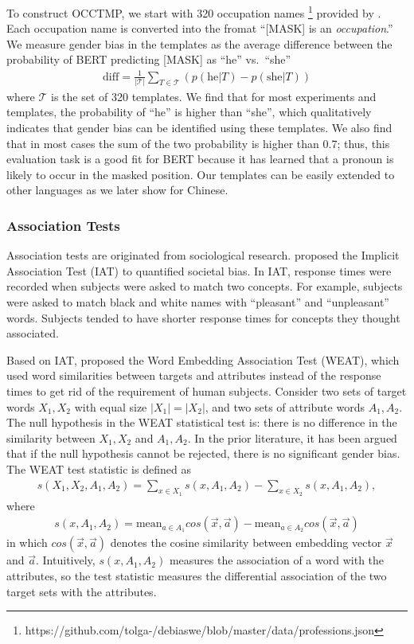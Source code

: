 To construct OCCTMP, we start with 320 occupation names \footnote{https://github.com/tolga-/debiaswe/blob/master/data/professions.json} provided by \cite{bolukbasi2016man}. Each occupation name is converted into the fromat ``[MASK] is an \textit{occupation}.''
We measure gender bias in the templates as the average difference between the probability of BERT predicting [MASK] as ``he'' vs.\ ``she''
\begin{eqnarray}
\text{diff}=\frac{1}{|{\mathcal T}|} \sum_{T \in
	{\mathcal T}}(p(\mbox{he}| T) - p(\mbox{she}|T))\nonumber
\end{eqnarray}
where $\mathcal T$ is the set of 320 templates.  We find that for most experiments and templates, the probability of ``he'' is higher than ``she'', which qualitatively indicates that gender bias can be identified using these templates. We also find that in most cases the sum of the two probability is higher than 0.7; thus, this evaluation task is a good fit for BERT because it has learned that a pronoun is likely to occur in the masked position. Our templates can be easily extended to other languages as we later show for Chinese.

\subsubsection{Association Tests}\label{sec:weat}
Association tests are originated from sociological research. \cite{greenwald1998measuring} proposed the Implicit Association Test (IAT) to quantified societal bias. In IAT, response times were recorded when subjects were asked to match two concepts. For example, subjects were asked to match black and white names with “pleasant” and “unpleasant” words. Subjects tended to have shorter response times for concepts they thought associated. 

Based on IAT, \cite{caliskan2017semantics} proposed the Word Embedding Association Test (WEAT), which used word similarities between targets and attributes instead of the response times to get rid of the requirement of human subjects. Consider two sets of target words $X_1,X_2$ with equal size $|X_1|=|X_2|$, and two sets of attribute words $A_1,A_2$. The null hypothesis in the WEAT statistical test is: there is no difference in the similarity between $X_1,X_2$ and $A_1,A_2$. In the prior literature, it has been argued that if the null hypothesis cannot be rejected, there is no significant gender bias.  
The WEAT test statistic is defined as
\begin{eqnarray}
s(X_1,X_2,A_1,A_2)=\sum_{x\in X_1}s(x,A_1,A_2)-\sum_{x\in X_2}s(x,A_1,A_2),\nonumber
\end{eqnarray}
where
\begin{eqnarray}
s(x,A_1,A_2)=\mbox{mean}_{a\in A_1}cos(\vec{x},\vec{a})-\mbox{mean}_{a\in A_2}cos(\vec{x},\vec{a})\nonumber
\end{eqnarray}
in which $cos(\vec{x},\vec{a})$ denotes the cosine similarity between embedding vector $\vec{x}$ and $\vec{a}$. Intuitively, $s(x,A_1,A_2)$ measures the association of a word with the attributes, so the test statistic measures the differential association of the two target sets with the attributes. 

